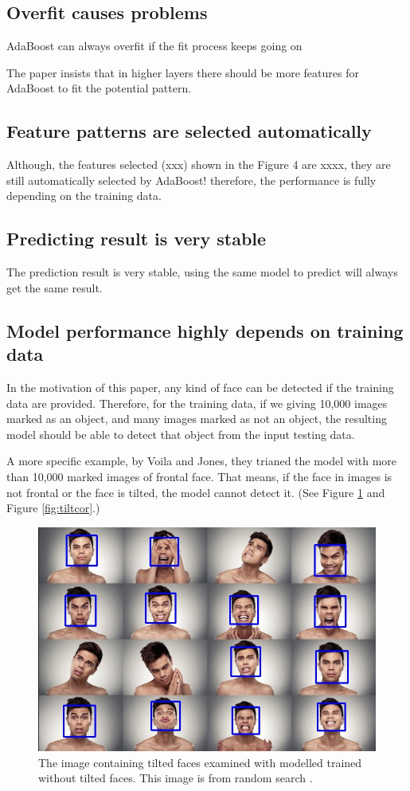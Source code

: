 \documentclass[10pt,twocolumn,letterpaper]{article}
\begin{document}
\subsection{Overfit causes problems}
AdaBoost can always overfit if the fit process keeps going on

The paper insists that in higher layers there should be more features for AdaBoost to fit the potential pattern.

\subsection{Feature patterns are selected automatically}
Although, the features selected (xxx) shown in the Figure 4 are xxxx, they are still automatically selected by AdaBoost!
therefore, the performance is fully depending on the training data.

\subsection{Predicting result is very stable}
The prediction result is very stable, using the same model to predict will always get the same result.

\subsection{Model performance highly depends on training data}
In the motivation of this paper, any kind of face can be detected if the training data are provided.
Therefore, for the training data, if we giving 10,000 images marked as an object, and many images marked as not an object,
the resulting model should be able to detect that object from the input testing data.

A more specific example, by Voila and Jones, they trianed the model with more than 10,000 marked images of frontal face.
That means, if the face in images is not frontal or the face is tilted, the model cannot detect it. (See Figure \ref{fig:tilt} and Figure \ref{fig:tiltcor}.)

\begin{figure}[t]
    \begin{center}
        \includegraphics[width=0.9\linewidth]{facial1}
    \end{center}
    \caption{The image containing tilted faces examined with modelled trained without tilted faces. This image is from random search \cite{facialimg}.}
    \label{fig:tilt}
\end{figure}
\end{document}
